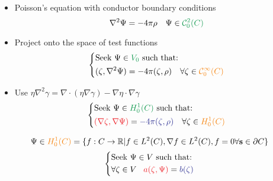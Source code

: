 \begin{itemize}
  \item Poisson's equation with conductor boundary conditions
        \begin{equation*}
            \nabla^2\Psi = -4\pi\rho
          \quad \Psi \in \mathcolor{ForestGreen}{\mathcal{C}^2_0(C)}
        \end{equation*}
  \item Project onto the space of test functions
        \begin{equation*}
          \left\{
          \begin{aligned}
            &\text{Seek $\Psi\in\mathcolor{ForestGreen}{V_0}$ such that:}\\
            &(\zeta, \nabla^2\Psi) =
            -4\pi(\zeta, \rho) \quad
            \forall
            \zeta\in\mathcolor{BurntOrange}{\mathcal{C}^\infty_0(C)}
          \end{aligned}
          \right.
        \end{equation*}
  \item Use
    $\eta\nabla^2\gamma = \nabla\cdot(\eta\nabla\gamma) - \nabla\eta\cdot\nabla\gamma$
        \begin{equation*}
          \left\{
          \begin{aligned}
            &\text{Seek $\Psi \in \mathcolor{ForestGreen}{H_0^1(C)}$ such that:}\\
            &\mathcolor{Red}{(\nabla\zeta, \nabla\Psi)} =
            \mathcolor{Blue}{-4\pi(\zeta, \rho)} \quad
            \forall \zeta\in \mathcolor{BurntOrange}{H_0^1(C)}
          \end{aligned}
          \right.
        \end{equation*}
\end{itemize}
\begin{equation*}
  \Psi\in \mathcolor{BurntOrange}{H_0^1(C)} = \lbrace f : C \rightarrow
  \mathbb{R} | f \in L^2(C), \nabla f \in L^2(C), f = 0 \forall \vect{s}
  \in\partial C \rbrace
\end{equation*}
\begin{equation}
  \left\{
  \begin{aligned}
    &\text{Seek $\Psi \in V$ such that:}\\
    &\forall \zeta \in V \,\,\,\,\,
    \mathcolor{Red}{a(\zeta, \Psi)} = \mathcolor{Blue}{b(\zeta)}
  \end{aligned}
  \right.
  \label{eq:weak}
\end{equation}


